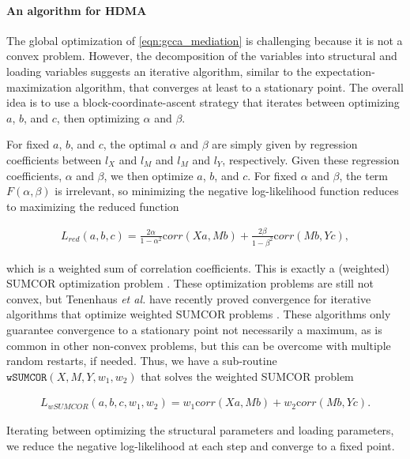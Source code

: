 \documentclass[
]{article}
\begin{document}
\paragraph{An algorithm for HDMA}\label{an-algorithm-for-hdma}

The global optimization of \ref{eqn:gcca_mediation} is challenging
because it is not a convex problem. However, the decomposition of the
variables into structural and loading variables suggests an iterative
algorithm, similar to the expectation-maximization algorithm, that
converges at least to a stationary point. The overall idea is to use a
block-coordinate-ascent strategy that iterates between optimizing \(a\),
\(b\), and \(c\), then optimizing \(\alpha\) and \(\beta\).

For fixed \(a\), \(b\), and \(c\), the optimal \(\alpha\) and \(\beta\)
are simply given by regression coefficients between \(l_X\) and \(l_M\)
and \(l_M\) and \(l_Y\), respectively. Given these regression
coefficients, \(\alpha\) and \(\beta\), we then optimize \(a\), \(b\),
and \(c\). For fixed \(\alpha\) and \(\beta\), the term
\(F(\alpha, \beta)\) is irrelevant, so minimizing the negative
log-likelihood function reduces to maximizing the reduced function

\begin{align}
L_{red}(a,b,c) = \frac{2\alpha}{1-\alpha^2} {\mathrm corr}\left(Xa, Mb\right) + \frac{2\beta}{1-\beta^2} {\mathrm corr}\left(Mb, Yc\right),
\end{align}

which is a weighted sum of correlation coefficients. This is exactly a
(weighted) SUMCOR optimization problem \cite{tenenhaus2011regularized}.
These optimization problems are still not convex, but Tenenhaus
\textit{et al.} have recently proved convergence for iterative
algorithms that optimize weighted SUMCOR problems
\cite{tenenhaus2011regularized,
tenenhaus2017regularized, tenenhaus2015kernel}. These algorithms only
guarantee convergence to a stationary point not necessarily a maximum,
as is common in other non-convex problems, but this can be overcome with
multiple random restarts, if needed. Thus, we have a sub-routine
\(\texttt{wSUMCOR}(X, M, Y, w_1, w_2)\) that solves the weighted SUMCOR
problem

\begin{align}
L_{wSUMCOR}(a,b,c, w_1, w_2) = w_1 {\mathrm corr}\left(Xa, Mb\right) + w_2 {\mathrm corr}\left(Mb, Yc\right).
\end{align}

Iterating between optimizing the structural parameters and loading
parameters, we reduce the negative log-likelihood at each step and
converge to a fixed point.
\end{document}
